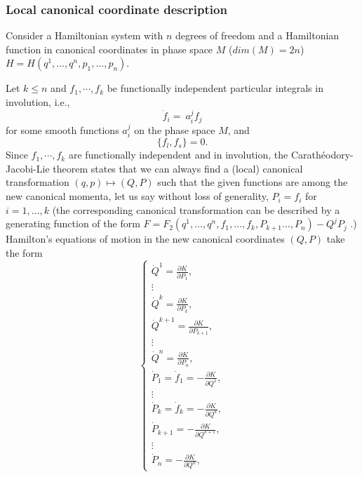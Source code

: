 \documentclass[10pt,a4paper]{article}
\begin{document}
\subsubsection{Local canonical coordinate description}
Consider a Hamiltonian system with $n$ degrees of freedom and a Hamiltonian function in canonical coordinates in phase space $M$ ($dim(M)=2n$) $H=H(q^{1},\ldots,q^{n},p_{1},\ldots,p_{n})$. 

Let $k\leq n$ and $f_{1},\cdots,f_{k}$ be functionally independent particular integrals in involution, i.e.,
\begin{equation*}
\dot{f}_{i} = \ a^{j}_{i}f_{j}
\end{equation*}
for some smooth functions $a^{j}_{i}$ on the phase space $M$, and
\begin{equation*}
\lbrace f_{l},f_{s}\rbrace=0.
\end{equation*}
Since $f_{1},\cdots,f_{k}$ are functionally independent and in involution, the Carathéodory-Jacobi-Lie theorem \cite{libermann2012symplectic,AKN2006,Lee2012} states that we can always find a (local) canonical transformation $(q,p)\mapsto (Q,P)$ such that the given functions are among the new canonical momenta, let us say without loss of generality, $P_{i}=f_{i}$ for $i=1,\ldots,k$ (the corresponding canonical transformation can be described by a generating function of the form $F=F_{2}(q^{1},\ldots,q^{n},f_{1},\ldots,f_{k},P_{k+1}\ldots,P_{n})-Q^{j}P_{j}$ \cite{GPS2002,landau1982mechanics,Calkin96}.) Hamilton's equations of motion in the new canonical coordinates $(Q,P)$ take the form
\begin{equation*}
\label{eqK}
\left\lbrace \begin{array}{c}
\dot{Q}^{1}= \frac{\partial K}{\partial P_{1}},\\ 
\vdots \\ 
\dot{Q}^{k}= \frac{\partial K}{\partial P_{k}},\\ 
\dot{Q}^{k+1}= \frac{\partial K}{\partial P_{k+1}},\\
\vdots\\
\dot{Q}^{n}= \frac{\partial K}{\partial P_{n}},\\ 
\dot{P}_{1}=\dot{f}_{1}=-\frac{\partial K}{\partial Q^{1}},\\ 
\vdots \\ 
\dot{P}_{k}=\dot{f}_{k}=-\frac{\partial K}{\partial Q^{k}},\\ 
\dot{P}_{k+1}= -\frac{\partial K}{\partial Q^{k+1}},\\
\vdots\\
\dot{P}_{n}= -\frac{\partial K}{\partial Q^{n}},
\end{array} \right.
\end{equation*}
\end{document}
